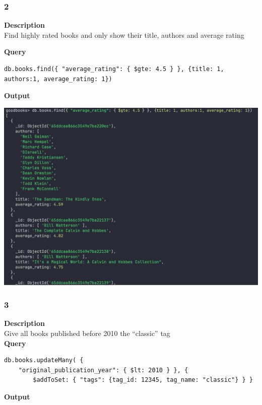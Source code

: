 \documentclass[11pt]{article}
\begin{document}
\subsubsection{2}
\label{sec:org9e175c8}
\textbf{Description}\\
Find highly rated books and only show their title, authors and average rating

\linebreak
\textbf{Query}
\begin{verbatim}
db.books.find({ "average_rating": { $gte: 4.5 } }, {title: 1, authors:1, average_rating: 1})
\end{verbatim}

\linebreak
\textbf{Output}\\
\begin{center}
\includegraphics[width=1\textwidth]{images/KFWJOR001/2.png}
\end{center}
\pagebreak
\subsubsection{3}
\label{sec:orgc8ef325}
\textbf{Description}\\
Give all books published before 2010 the “classic” tag\\
\linebreak
\textbf{Query}
\begin{verbatim}
db.books.updateMany( {
    "original_publication_year": { $lt: 2010 } }, {
        $addToSet: { "tags": {tag_id: 12345, tag_name: "classic"} } }
\end{verbatim}
\linebreak
\textbf{Output}\\
\end{document}

